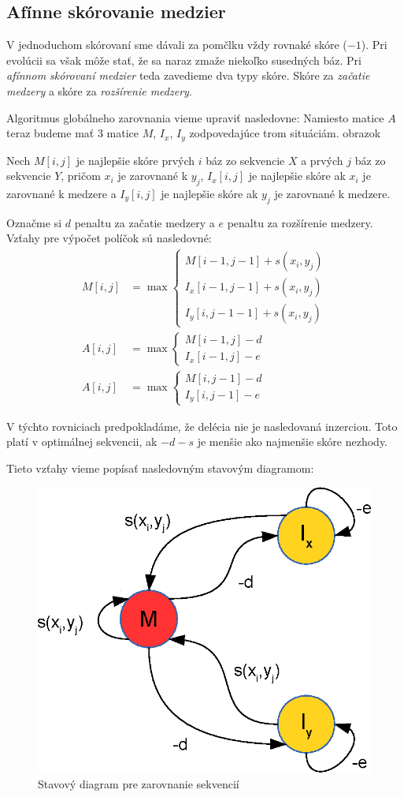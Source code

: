\subsection{Afínne skórovanie medzier}
\label{subsec:affine-gap-scoring}
V jednoduchom skórovaní sme dávali za pomčlku vždy rovnaké skóre ($-1$). Pri evolúcii sa však môže stať, že sa naraz zmaže niekoľko susedných báz. Pri \textit{afínnom skórovaní medzier} teda zavedieme dva typy skóre. Skóre za \textit{začatie medzery} a skóre za \textit{rozšírenie medzery}.

Algoritmus globálneho zarovnania vieme upraviť nasledovne: Namiesto matice $A$ teraz budeme mať 3 matice $M$, $I_x$, $I_y$ zodpovedajúce trom situáciám. \todo obrazok

Nech $M[i,j]$ je najlepšie skóre prvých $i$ báz zo sekvencie $X$ a prvých $j$ báz zo sekvencie $Y$, pričom $x_i$ je zarovnané k $y_j$, $I_x[i,j]$ je najlepšie skóre ak $x_i$ je zarovnané k medzere a $I_y[i,j]$ je najlepšie skóre ak $y_j$ je zarovnané k medzere.

Označme si $d$ penaltu za začatie medzery a $e$ penaltu za rozšírenie medzery. Vzťahy pre výpočet políčok sú nasledovné:
\begin{align*}
M[i,j] &= \max \left\{
\begin{array}{l}
M[i-1,j-1]+s(x_i, y_j)\\
I_x[i-1,j-1]+s(x_i, y_j)\\
I_y[i,j-1-1]+s(x_i, y_j)
\end{array} \right.\\
A[i,j] &= \max \left\{
\begin{array}{l}
M[i-1,j]-d\\
I_x[i-1,j]-e
\end{array} \right.\\
A[i,j] &= \max \left\{
\begin{array}{l}
M[i,j-1]-d\\
I_y[i,j-1]-e
\end{array} \right.
\end{align*}

V týchto rovniciach predpokladáme, že delécia nie je nasledovaná inzerciou. Toto platí v optimálnej sekvencii, ak $-d-s$ je menšie ako najmenšie skóre nezhody.

Tieto vzťahy vieme popísať nasledovným stavovým diagramom:
\begin{figure}[htp]
    \centering
    \includegraphics[width=.5\textwidth]{images/alignment_fsa}
    \caption{Stavový diagram pre zarovnanie sekvencií}
    \label{fig:alignment-fsa}
\end{figure}

